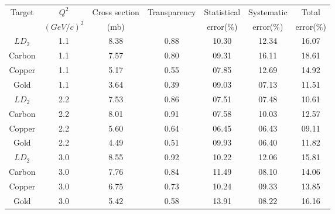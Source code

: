 \begin{center}
\begin{tabular}{||c|c|c|c|c|c|c||}\hline
 Target & $Q^2$ & Cross section & Transparency & Statistical & Systematic & Total \\
 & $(GeV/c)^2$ & (mb) & & error($\%$)& error($\%$)&error($\%$) \\\hline
$LD_2$ & 1.1 & 8.38 & 0.88 & 10.30 & 12.34 & 16.07\\
Carbon & 1.1 & 7.57 & 0.80 & 09.31 & 16.11 & 18.61\\
Copper & 1.1 & 5.17 & 0.55 & 07.85 & 12.69 & 14.92\\
Gold   & 1.1 & 3.64 & 0.39 & 09.03 & 07.13 & 11.51\\\hline
$LD_2$ & 2.2 & 7.53 & 0.86 & 07.51 & 07.48 & 10.61\\
Carbon & 2.2 & 8.01 & 0.91 & 07.58 & 10.03 & 12.57\\
Copper & 2.2 & 5.60 & 0.64 & 06.45 & 06.43 & 09.11\\
Gold   & 2.2 & 4.49 & 0.51 & 09.93 & 06.40 & 11.82\\\hline
$LD_2$ & 3.0 & 8.55 & 0.92 & 10.22 & 12.06 & 15.81\\
Carbon & 3.0 & 7.76 & 0.84 & 11.49 & 08.10 & 14.06\\
Copper & 3.0 & 6.75 & 0.73 & 10.24 & 09.33 & 13.85\\
Gold   & 3.0 & 5.42 & 0.58 & 13.91 & 08.22 & 16.16\\\hline
\end{tabular}
\end{center}